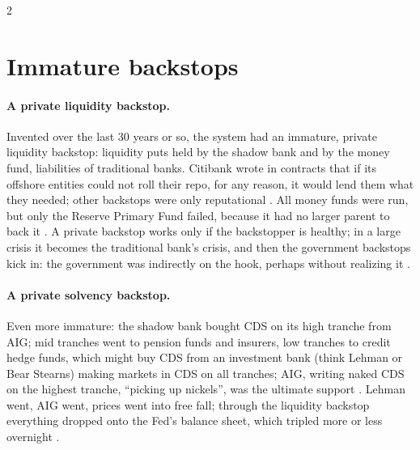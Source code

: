 \begin{paracol}{2}
\section{Immature backstops}\label{sec:cbs-backstops}

\paragraph{A private liquidity backstop.} Invented over the last 30 years or so, the system had an immature, private liquidity backstop: liquidity puts held by the
shadow bank and by the money fund, liabilities of traditional banks. Citibank wrote in contracts that if its offshore entities could not roll their repo, for any
reason, it would lend them what they needed; other backstops were only reputational .
All money funds were run, but only the Reserve Primary Fund failed, because it had no larger parent to back it . A private backstop works
only if the backstopper is healthy; in a large crisis it becomes the traditional bank's crisis, and then the government backstops kick in: the government was
indirectly on the hook, perhaps without realizing it .

\paragraph{A private solvency backstop.} Even more immature: the shadow bank bought CDS on its high tranche from AIG; mid tranches went to pension funds and insurers,
low tranches to credit hedge funds, which might buy CDS from an investment bank (think Lehman or Bear Stearns) making markets in CDS on all tranches; AIG, writing
naked CDS on the highest tranche, ``picking up nickels'', was the ultimate support .
Lehman went, AIG went, prices went into free fall; through the liquidity backstop everything dropped onto the Fed's balance sheet, which tripled more or less
overnight .

\begin{nfigure}
\begin{taccts}
\quad
{}\quad
{}
\end{taccts}
\begin{taccts}
\quad
{}\quad
{}
\end{taccts}
\caption{Immature private liquidity and solvency backstops of the shadow banking system .}\label{fig:cbs-immature}
\end{nfigure}


\end{paracol}
